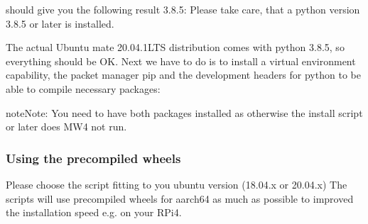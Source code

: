 \documentclass[a4paper,10pt,english]{sphinxmanual}
\begin{document}
\begin{sphinxVerbatim}[commandchars=\\\{\}]
 
\end{sphinxVerbatim}

\sphinxAtStartPar
should give you the following result 3.8.5: Please take care, that a python
version 3.8.5 or later is installed.

\sphinxAtStartPar
The actual Ubuntu mate 20.04.1LTS distribution comes with python 3.8.5, so
everything should be OK. Next we have to do is to install a virtual environment
capability, the packet manager pip and the development headers for python to be
able to compile necessary packages:

\begin{sphinxVerbatim}[commandchars=\\\{\}]
   
   
   
\end{sphinxVerbatim}

\begin{sphinxadmonition}{note}{Note:}
\sphinxAtStartPar
You need to have both packages installed as otherwise the install script or
later does MW4 not run.
\end{sphinxadmonition}


\subsubsection{Using the precompiled wheels}
\label{\detokenize{install/rpi4:using-the-precompiled-wheels}}
\sphinxAtStartPar
Please choose the script fitting to you ubuntu version (18.04.x or 20.04.x)
The scripts will use precompiled wheels for aarch64 as much as possible to improved
the installation speed e.g. on your RPi4.

\begin{sphinxVerbatim}[commandchars=\\\{\}]


\end{sphinxVerbatim}
\end{document}
